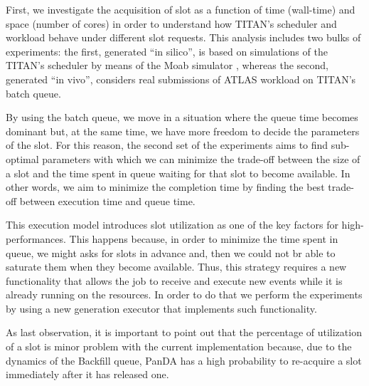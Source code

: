 First, we investigate the acquisition of slot as a function of time (wall-time) and space (number of cores) in order to understand how TITAN's scheduler and workload behave under different slot requests. This analysis includes two bulks of experiments: the first, generated ``in silico'', is based on simulations of the TITAN's scheduler by means of the Moab simulator \cite{}, whereas the second, generated ``in vivo'',  considers real submissions of ATLAS workload on TITAN's batch queue.

By using the batch queue, we move in a situation where the queue time becomes dominant but, at the same time, we have more freedom to decide the parameters of the slot. For this reason, the second set of the experiments aims to find sub-optimal parameters with which we can minimize the trade-off between the size of a slot and the time spent in queue waiting for that slot to become available. In other words, we aim to minimize the completion time by finding the best trade-off between execution time and queue time.

This execution model introduces slot utilization as one of the key factors for high-performances. This happens because, in order to minimize the time spent in queue, we might asks for slots in advance and, then we could not br able to saturate them when they become available. Thus, this strategy requires a new functionality that allows the job to receive and execute new events while it is already running on the resources.
In order to do that we perform the experiments by using a new generation executor that implements such functionality.

As last observation, it is important to point out that the percentage of utilization of a slot is minor problem with the current implementation because, due to the dynamics of the Backfill queue, PanDA has a high probability to re-acquire a slot immediately after it has released one. 
